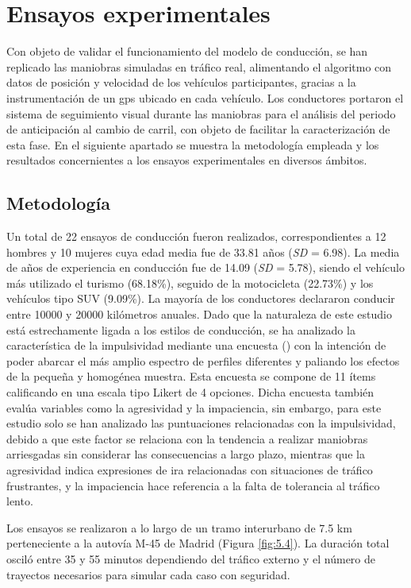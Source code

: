 \newpage

\section{Ensayos experimentales}\label{53}
Con objeto de validar el funcionamiento del modelo de conducción, se han replicado las maniobras simuladas en tráfico real, alimentando el algoritmo con datos de posición y velocidad de los vehículos participantes, gracias a la instrumentación de un \gls{gps} ubicado en cada vehículo. Los conductores portaron el sistema de seguimiento visual durante las maniobras para el análisis del periodo de anticipación al cambio de carril, con objeto de facilitar la caracterización de esta fase. En el siguiente apartado se muestra la metodología empleada y los resultados concernientes a los ensayos experimentales en diversos ámbitos.

\subsection{Metodología}\label{531}
Un total de 22 ensayos de conducción fueron realizados, correspondientes a 12 hombres y 10 mujeres cuya edad media fue de 33.81 años (\emph{SD} = 6.98). La media de años de experiencia en conducción fue de 14.09 (\emph{SD} = 5.78), siendo el vehículo más utilizado el turismo (68.18\%), seguido de la motocicleta (22.73\%) y los vehículos tipo SUV (9.09\%). La mayoría de los conductores declararon conducir entre 10000 y 20000 kilómetros anuales. Dado que la naturaleza de este estudio está estrechamente ligada a los estilos de conducción, se ha analizado la característica de la impulsividad mediante una encuesta (\cite{perezmoreno}) con la intención de poder abarcar el más amplio espectro de perfiles diferentes y paliando los efectos de la pequeña y homogénea muestra. Esta encuesta se compone de 11 ítems calificando en una escala tipo Likert de 4 opciones. Dicha encuesta también evalúa variables como la agresividad y la impaciencia, sin embargo, para este estudio solo se han analizado las puntuaciones relacionadas con la impulsividad, debido a que este factor se relaciona con la tendencia a realizar maniobras arriesgadas sin considerar las consecuencias a largo plazo, mientras que la agresividad indica expresiones de ira relacionadas con situaciones de tráfico frustrantes, y la impaciencia hace referencia a la falta de tolerancia al tráfico lento.

Los ensayos se realizaron a lo largo de un tramo interurbano de 7.5 km perteneciente a la autovía M-45 de Madrid (Figura \ref{fig:5.4}). La duración total osciló entre 35 y 55 minutos dependiendo del tráfico externo y el número de trayectos necesarios para simular cada caso con seguridad.


